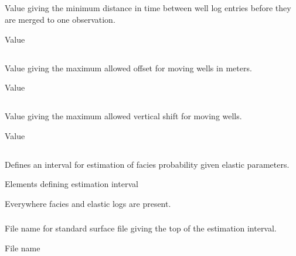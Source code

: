 \subsection{}
 \slist
   \item \Description Value giving the minimum distance in time between well log entries before they are merged to one observation.
   \item \Argument Value
   \item {}
 \elist

\subsection{}
 \slist
   \item \Description Value giving the maximum allowed offset for moving wells in meters.
   \item \Argument Value
   \item {}
 \elist

\subsection{}
 \slist
   \item \Description Value giving the maximum allowed vertical shift for moving wells.
   \item \Argument Value
   \item {}
 \elist

\subsection{}
 \slist
   \item \Description Defines an interval for estimation of facies probability given elastic parameters.
   \item \Argument Elements defining estimation interval
   \item \Default Everywhere facies and elastic logs are present.
 \elist

\subsubsection{}
 \slist
   \item \Description File name for standard surface file giving the top of the estimation interval.
   \item \Argument File name
   \item \Default
 \elist


